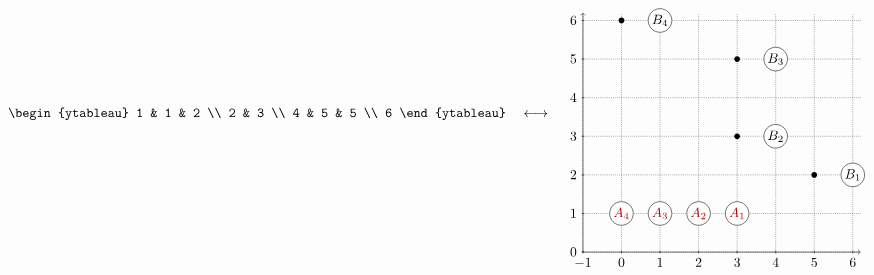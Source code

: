 \documentclass[reqno]{amsart}
\newcommand{\0}{\phantom{c}}
\theoremstyle{plain}
\theoremstyle{definition}
\numberwithin{equation}{section}
\begin{document}
\begin{figure}[t]
\[
\begin{ytableau} 1 & 1 & 2 \\ 2 & 3 \\ 4 & 5 & 5 \\ 6 \end{ytableau}
\quad \longleftrightarrow \quad
\begin{tikzpicture}[baseline=3.5cm]
  \draw[densely dotted] (-1,0) grid (6.2,6.2);
  \draw[->] (-1,0) -- (-1,6.2);
  \draw[->] (-1,0) -- (6.2,0);
  \foreach \x/\xtext in {-1, 0, 1, 2, 3, 4, 5, 6}
     \draw (\x cm,1pt) -- (\x cm,-1pt) node[anchor=north] {$\xtext$};
  \foreach \y/\ytext in {0, 1, 2, 3, 4, 5, 6}
     \draw (-1cm+1pt,\y cm) -- (-1cm-1pt,\y cm) node[anchor=east] {$\ytext$};
  \foreach \x in {1, 2, 3, 4}
    \node[circle,fill=white,draw=black,text=darkred,inner sep=1pt] (A\x) at (4-\x,1) {$A_{\x}$};

  \node[circle,fill=white,draw=black,text=black,inner sep=1pt] (B4) at (1+4-4,6) {$B_4$};
  \node[circle,fill=black,inner sep=1.5pt] (B4p) at (1+4-4-1,6) {};
  \node[circle,fill=white,draw=black,text=black,inner sep=1pt] (B3) at (3+4-3,5) {$B_3$};
  \node[circle,fill=black,inner sep=1.5pt] (B3p) at (3+4-3-1,5) {};
  \node[circle,fill=white,draw=black,text=black,inner sep=1pt] (B2) at (2+4-2,3) {$B_2$};
  \node[circle,fill=black,inner sep=1.5pt] (B2p) at (2+4-2-1,3) {};
  \node[circle,fill=white,draw=black,text=black,inner sep=1pt] (B1) at (3+4-1,2) {$B_1$};
  \node[circle,fill=black,inner sep=1.5pt] (B1p) at (3+4-1-1,2) {};


\end{tikzpicture}\]
\end{figure}
\end{document}
